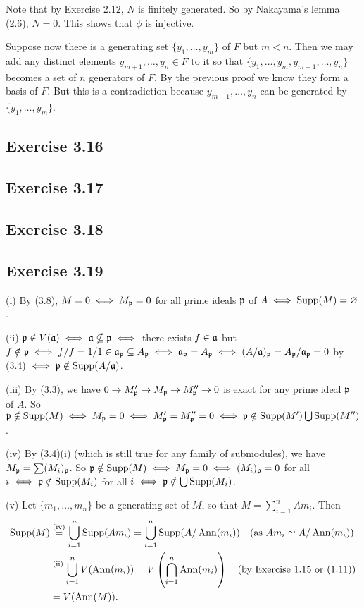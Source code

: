 \documentclass[../A&M.tex]{subfiles}
\begin{document}
Note that by Exercise 2.12, $N$ is finitely generated. So by Nakayama's lemma (2.6), $N=0$. This shows that $\phi$ is injective.

Suppose now there is a generating set $\{y_1,\ldots,y_m\}$ of $F$ but $m<n$. Then we may add any distinct elements $y_{m+1},\ldots,y_n \in F$ to it so that $\{y_1,\ldots,y_m,y_{m+1},\ldots,y_n\}$ becomes a set of $n$ generators of $F$. By the previous proof we know they form a basis of $F$. But this is a contradiction because $y_{m+1},\ldots,y_n$ can be generated by $\{y_1,\ldots,y_m\}$.

\subsection*{Exercise 3.16}

\subsection*{Exercise 3.17}

\subsection*{Exercise 3.18}

\subsection*{Exercise 3.19}

(i) By (3.8), $M=0 \iff M_{\mathfrak{p}} = 0$ for all prime ideals $\mathfrak{p}$ of $A \iff \operatorname{Supp}(M) = \varnothing$.

(ii) $\mathfrak{p} \notin V(\mathfrak{a}) \iff \mathfrak{a} \nsubseteq \mathfrak{p} \iff$ there exists $f \in \mathfrak{a}$ but $f \notin \mathfrak{p} \iff f/f = 1/1 \in \mathfrak{a}_{\mathfrak{p}} \subseteq A_{\mathfrak{p}}\iff \mathfrak{a}_{\mathfrak{p}} = A_{\mathfrak{p}} \iff (A/\mathfrak{a})_{\mathfrak{p}} = A_{\mathfrak{p}}/\mathfrak{a}_{\mathfrak{p}} = 0$ by (3.4) $\iff \mathfrak{p} \notin \operatorname{Supp}(A/\mathfrak{a})$.

(iii) By (3.3), we have $0 \to M'_{\mathfrak{p}} \to M_{\mathfrak{p}} \to M''_{\mathfrak{p}} \to 0$ is exact for any prime ideal $\mathfrak{p}$ of $A$. So $\mathfrak{p} \notin \operatorname{Supp}(M) \iff M_{\mathfrak{p}}=0 \iff M'_{\mathfrak{p}} = M''_{\mathfrak{p}} = 0 \iff \mathfrak{p} \notin \operatorname{Supp}(M') \bigcup \operatorname{Supp}(M'')$.

(iv) By (3.4)(i) (which is still true for any family of submodules), we have $M_{\mathfrak{p}} = \sum (M_i)_{\mathfrak{p}}$. So $\mathfrak{p} \notin \operatorname{Supp}(M) \iff M_{\mathfrak{p}} = 0 \iff (M_i)_{\mathfrak{p}} = 0$ for all $i \iff \mathfrak{p} \notin \operatorname{Supp}(M_i)$ for all $i \iff \mathfrak{p} \notin \bigcup \operatorname{Supp}(M_i)$.

(v) Let $\{m_1,\ldots,m_n\}$ be a generating set of $M$, so that $M = \sum_{i=1}^n Am_i$. Then
\begin{align*}
\operatorname{Supp}(M)
&\overset{\text{(iv)}}{=} \bigcup_{i=1}^n \operatorname{Supp}(Am_i) = \bigcup_{i=1}^n \operatorname{Supp}(A/\operatorname{Ann}(m_i))  \quad \text{(as } Am_i \simeq A/\operatorname{Ann}(m_i) \text{)} \\ 
&\overset{\text{(ii)}}{=} \bigcup_{i=1}^n V(\operatorname{Ann}(m_i)) 
=V\left(\bigcap_{i=1}^n \operatorname{Ann}(m_i) \right) \quad \text{(by Exercise 1.15 or (1.11))} \\ 
&= V(\operatorname{Ann}(M)).
\end{align*}
\end{document}
